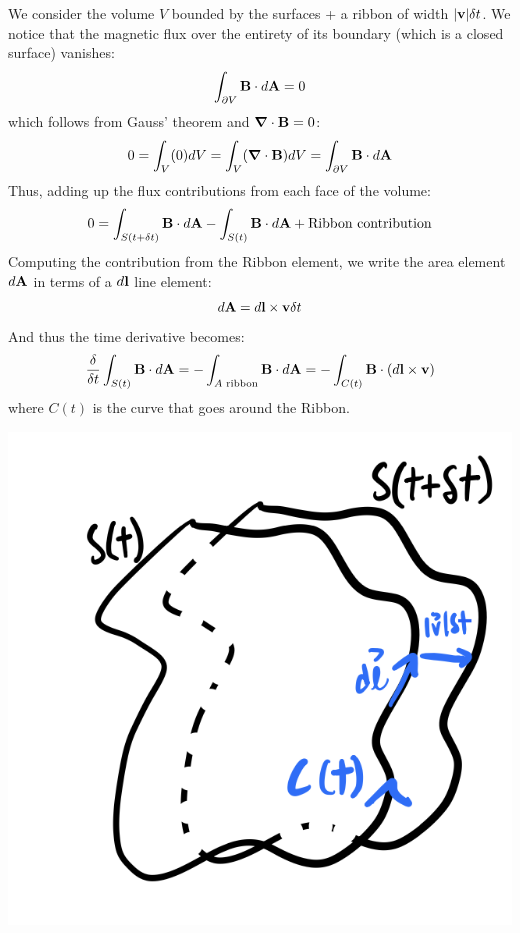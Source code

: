 We consider the volume $V$ bounded by the surfaces + a ribbon of width $\lvert \mathbf{v} \rvert\delta t$. We notice that the magnetic flux over the entirety of its boundary (which is a closed surface) vanishes:
\begin{equation}
    \int_{\partial V} \mathbf{B} \cdot d\mathbf{A} = 0
\end{equation}
which follows from Gauss' theorem and $\nabla \cdot \v{B} = 0$:
\begin{equation}
    0 = \int_{V}(0) dV =  \int_{V}(\nabla \cdot \v{B}) dV = \int_{\p V}\v{B} \cdot d\v{A}
\end{equation}
Thus, adding up the flux contributions from each face of the volume:
\begin{equation}
    0 = \int_{S(t + \delta t)}\mathbf{B} \cdot d\mathbf{A} - \int_{S(t)}\mathbf{B} \cdot d\mathbf{A} + \text{Ribbon contribution}
\end{equation}
Computing the contribution from the Ribbon element, we write the area element $d\mathbf{A}$ in terms of a $d\mathbf{l}$ line element:
\begin{equation}
    d\mathbf{A} = d\mathbf{l} \times \mathbf{v}\delta t
\end{equation}
And thus the time derivative becomes:
\begin{equation}
    \frac{\delta}{\delta t}\int_{S(t)}\mathbf{B} \cdot d\mathbf{A} = -\int_{A \text{ ribbon}} \mathbf{B} \cdot d\mathbf{A} = -\int_{C(t)}\mathbf{B} \cdot (d\mathbf{l} \times \mathbf{v})
\end{equation}
where $C(t)$ is the curve that goes around the Ribbon. 

\begin{center}
    \includegraphics[scale=0.35]{Lectures/Images/lec16-circumference.png}
\end{center}

